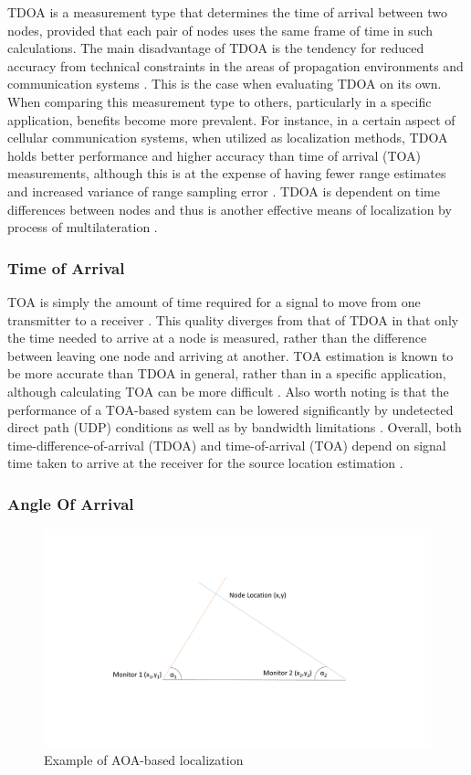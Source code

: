 \documentclass[12pt]{uthesis-v12}  %
\begin{document}
TDOA is a measurement type that determines the time of arrival between two nodes, provided that each pair of nodes uses the same frame of time in such calculations. The main disadvantage of TDOA is the tendency for reduced accuracy from technical constraints in the areas of propagation environments and communication systems \cite{kim}. This is the case when evaluating TDOA on its own. When comparing this measurement type to others, particularly in a specific application, benefits become more prevalent. For instance, in a certain aspect of cellular communication systems, when utilized as localization methods, TDOA holds better performance and higher accuracy than time of arrival (TOA) measurements, although this is at the expense of having fewer range estimates and increased variance of range sampling error \cite{hara}. TDOA is dependent on time differences between nodes \cite{cakir} and thus is another effective means of localization by process of multilateration \cite{pelant}.

\subsubsection{Time of Arrival}

TOA is simply the amount of time required for a signal to move from one transmitter to a receiver \cite{patwari}. This quality diverges from that of TDOA in that only the time needed to arrive at a node is measured, rather than the difference between leaving one node and arriving at another. TOA estimation is known to be more accurate than TDOA in general, rather than in a specific application, although calculating TOA can be more difficult \cite{hwang}. Also worth noting is that the performance of a TOA-based system can be lowered significantly by undetected direct path (UDP) conditions as well as by bandwidth limitations \cite{hatami}. Overall, both time-difference-of-arrival (TDOA) and time-of-arrival (TOA) depend on signal time taken to arrive at the receiver for the source location estimation \cite{yang2,chan}.

\subsubsection{Angle Of Arrival}

\begin{figure}[!t]
\centering
\includegraphics[width=5in]{aoa}
\caption{Example of AOA-based localization}
\label{aoa}
\end{figure}
\end{document}
